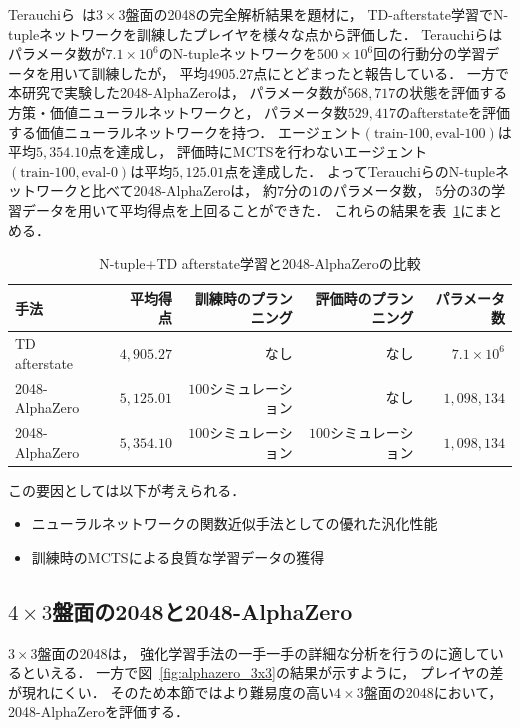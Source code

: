 Terauchiら~\cite{Min2048_matsuzaki}は$3\times3$盤面の2048の完全解析結果を題材に， TD-afterstate学習でN-tupleネットワークを訓練したプレイヤを様々な点から評価した．
Terauchiらはパラメータ数が$7.1\times{10}^6$のN-tupleネットワークを$500 \times {10}^6$回の行動分の学習データを用いて訓練したが， 平均$4905.27$点にとどまったと報告している．
一方で本研究で実験した2048-AlphaZeroは， パラメータ数が$568,717$の状態を評価する方策・価値ニューラルネットワークと， パラメータ数$529,417$のafterstateを評価する価値ニューラルネットワークを持つ．
エージェント$(\text{train-}100,\text{eval-}100)$は平均$5,354.10$点を達成し， 評価時にMCTSを行わないエージェント$(\text{train-}100,\text{eval-}0)$は平均$5,125.01$点を達成した．
よってTerauchiらのN-tupleネットワークと比べて2048-AlphaZeroは， 約$7$分の$1$のパラメータ数， $5$分の$3$の学習データを用いて平均得点を上回ることができた．
これらの結果を表~\ref{table:terauchi}にまとめる．
\begin{table}[t]
    \centering
    \begin{tabular}{lrrrr}
        \hline \hline
        手法 & 平均得点 & 訓練時のプランニング & 評価時のプランニング & パラメータ数\\ \hline
        TD afterstate~\cite{Min2048_matsuzaki} & $4,905.27$ & なし & なし & $7.1\times{10}^6$\\
        2048-AlphaZero & $5,125.01$ & $100$シミュレーション & なし & $1,098,134$\\
        2048-AlphaZero & $5,354.10$ & $100$シミュレーション & $100$シミュレーション & $1,098,134$ \\
        \hline
    \end{tabular}
    \caption{N-tuple+TD afterstate学習と2048-AlphaZeroの比較}
    \label{table:terauchi}
\end{table}

この要因としては以下が考えられる．
\begin{itemize}
    \item ニューラルネットワークの関数近似手法としての優れた汎化性能
    \item 訓練時のMCTSによる良質な学習データの獲得
\end{itemize}

\subsection{$4\times3$盤面の2048と2048-AlphaZero}
$3\times3$盤面の2048は， 強化学習手法の一手一手の詳細な分析を行うのに適しているといえる．
一方で図~\ref{fig:alphazero_3x3}の結果が示すように， プレイヤの差が現れにくい．
そのため本節ではより難易度の高い$4\times3$盤面の2048において， 2048-AlphaZeroを評価する．